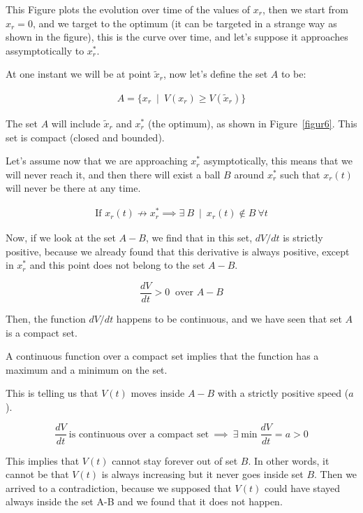 This Figure plots the evolution over time of the values of $x_r$, then we start from $x_r = 0$, and we target to the optimum (it can be targeted in a strange way as shown in the figure), this is the curve over time, and let's suppose it approaches assymptotically to $x_r^*$.

At one instant we will be at point $\widetilde{x}_r$, now let's define the set $A$ to be:

\begin{equation}
\begin{aligned}
A = \{{x}_r\ \mid\ V({x}_r) \geq V(\widetilde{x}_r) \}
\end{aligned}
\label{eq36}
\end{equation}

The set $A$ will include $\widetilde{x}_r$ and $x^*_r$ (the optimum), as shown in Figure~\ref{figur6}. This set is compact (closed and bounded).

Let's assume now that we are approaching $x^*_r$ asymptotically, this means that we will never reach it, and then there will exist a ball $B$ around $x^*_r$ such that ${x}_r(t)$ will never be there at any time.

\begin{equation}
\begin{aligned}
\mbox{If } {x}_r(t) \not\to x^*_r \implies \exists \ B\ \mid\ {x}_r(t) \not\in B\ \forall t
\end{aligned}
\label{eq37}
\end{equation}

Now, if we look at the set $A-B$, we find that in this set, $dV/dt$ is strictly positive, because we already found that this derivative is always positive, except in $x^*_r$ and this point does not belong to the set $A-B$.

$$\frac{dV}{dt} > 0\ \mbox{  over } A-B$$

Then, the function $dV/dt$ happens to be continuous, and we have seen that set $A$ is a compact set. 
\begin{claim}
A continuous function over a compact set implies that the function has a maximum and a minimum on the set.
\end{claim} 
This is telling us that $V(t)$ moves inside $A-B$ with a strictly positive speed ($a$).

$$\frac{dV}{dt} \ \mbox{is continuous over a compact set}\ \implies\ \exists \min \frac{dV}{dt} = a > 0$$

This implies that $V(t)$ cannot stay forever out of set $B$. In other words, it cannot be that $V(t)$ is always increasing but it never goes inside set $B$. Then we arrived to a contradiction, because we supposed that $V(t)$ could have stayed always inside the set A-B and we found that it does not happen.

